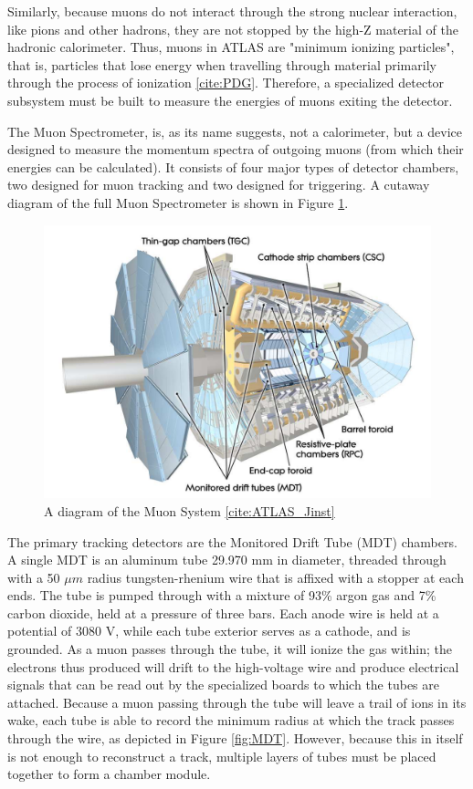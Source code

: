 Similarly, because muons do not interact through the strong nuclear interaction, like pions and other hadrons, they are not stopped by the high-Z material of the hadronic calorimeter. Thus, muons in ATLAS are "minimum ionizing particles", that is, particles that lose energy when travelling through material primarily through the process of ionization \ref{cite:PDG}. Therefore, a specialized detector subsystem must be built to measure the energies of muons exiting the detector.

The Muon Spectrometer, is, as its name suggests, not a calorimeter, but a device designed to measure the momentum spectra of outgoing muons (from which their energies can be calculated). It consists of four major types of detector chambers, two designed for muon tracking and two designed for triggering. A cutaway diagram of the full Muon Spectrometer is shown in Figure \ref{fig:MuSyst}.

\begin{figure}
  \includegraphics[width=\linewidth]{figures/detector_chapter/MuSyst.png}
  \caption{A diagram of the Muon System \ref{cite:ATLAS_Jinst}}
  \label{fig:MuSyst}
\end{figure}

The primary tracking detectors are the Monitored Drift Tube (MDT) chambers. A single MDT is an aluminum tube 29.970 mm in diameter, threaded through with a 50 $\mu m$ radius tungsten-rhenium wire that is affixed with a stopper at each ends. The tube is pumped through with a mixture of 93\% argon gas and 7\% carbon dioxide, held at a pressure of three bars. Each anode wire is held at a potential of 3080 V, while each tube exterior serves as a cathode, and is grounded. As a muon passes through the tube, it will ionize the gas within; the electrons thus produced will drift to the high-voltage wire and produce electrical signals that can be read out by the specialized boards to which the tubes are attached. Because a muon passing through the tube will leave a trail of ions in its wake, each tube is able to record the minimum radius at which the track passes through the wire, as depicted in Figure \ref{fig:MDT}. However, because this in itself is not enough to reconstruct a track, multiple layers of tubes must be placed together to form a chamber module.

